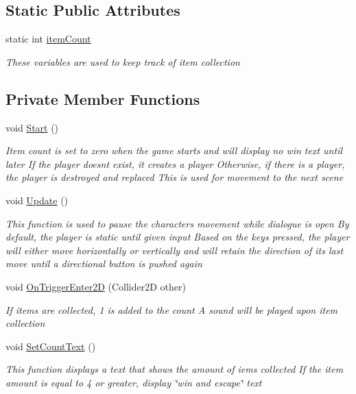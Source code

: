 \subsection*{Static Public Attributes}
\begin{DoxyCompactItemize}
\item 
static int \mbox{\hyperlink{class_player_controller_a0e233eee5112d304b1bb5a118d6087e7}{item\+Count}}
\begin{DoxyCompactList}\small\item\em These variables are used to keep track of item collection \end{DoxyCompactList}\end{DoxyCompactItemize}
\subsection*{Private Member Functions}
\begin{DoxyCompactItemize}
\item 
void \mbox{\hyperlink{class_player_controller_ae1117d9c4da3193181cddad2c814e467}{Start}} ()
\begin{DoxyCompactList}\small\item\em Item count is set to zero when the game starts and will display no win text until later If the player doesn\textquotesingle{}t exist, it creates a player Otherwise, if there is a player, the player is destroyed and replaced This is used for movement to the next scene \end{DoxyCompactList}\item 
void \mbox{\hyperlink{class_player_controller_ae8bc83dffb99867a04be016473ed2c43}{Update}} ()
\begin{DoxyCompactList}\small\item\em This function is used to pause the character\textquotesingle{}s movement while dialogue is open By default, the player is static until given input Based on the keys pressed, the player will either move horizontally or vertically and will retain the direction of it\textquotesingle{}s last move until a directional button is pushed again \end{DoxyCompactList}\item 
void \mbox{\hyperlink{class_player_controller_a751c7590dfb8e726d1eb3a27d0b197a2}{On\+Trigger\+Enter2D}} (Collider2D other)
\begin{DoxyCompactList}\small\item\em If items are collected, 1 is added to the count A sound will be played upon item collection \end{DoxyCompactList}\item 
void \mbox{\hyperlink{class_player_controller_ad55b05bf5e6a5ae39a2a01700f1772ce}{Set\+Count\+Text}} ()
\begin{DoxyCompactList}\small\item\em This function displays a text that shows the amount of iems collected If the item amount is equal to 4 or greater, display \char`\"{}win and escape\char`\"{} text \end{DoxyCompactList}\end{DoxyCompactItemize}
